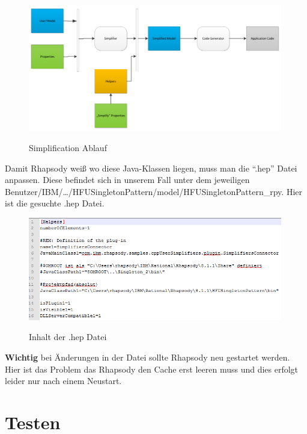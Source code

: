 \begin{figure}[!htbp]
	\centering
	\includegraphics[width=0.99\textwidth]{content/pictures/simplifier.png}
	\label{pic:bild}
	\caption{Simplification Ablauf \cite{oldDoku}}
\end{figure}

Damit Rhapsody weiß wo diese Java-Klassen liegen, muss man die \enquote{.hep} Datei
anpassen. Diese befindet sich in unserem Fall unter dem jeweiligen
Benutzer/IBM/\ldots/HFUSingletonPattern/model/HFUSingletonPattern_rpy. Hier ist
die gesuchte .hep Datei.
 
\begin{figure}[!htbp]
	\centering
	\includegraphics[width=0.99\textwidth]{content/pictures/hep.png}
	\label{pic:bild}
	\caption{Inhalt der .hep Datei}
\end{figure} 

\textbf{Wichtig} bei Änderungen in der Datei sollte Rhapsody neu gestartet
werden. Hier ist das Problem das Rhapsody den Cache erst leeren muss und dies
erfolgt leider nur nach einem Neustart. 
\section{Testen}

